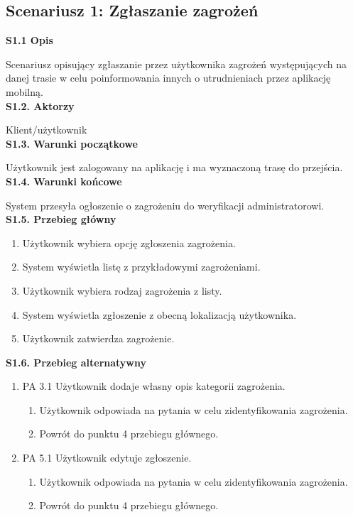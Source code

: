     \subsection*{Scenariusz 1: Zgłaszanie zagrożeń}
    \textbf{S1.1 Opis} \par
    Scenariusz opisujący zgłaszanie przez użytkownika zagrożeń występujących na danej trasie w celu poinformowania innych o utrudnieniach przez aplikację mobilną. \\
    \textbf{S1.2. Aktorzy} \par
    Klient/użytkownik \\
    \textbf{S1.3. Warunki początkowe} \par
    Użytkownik jest zalogowany na aplikację i ma wyznaczoną trasę do przejścia. \\
    \textbf{S1.4. Warunki końcowe} \par
    System przesyła ogłoszenie o zagrożeniu do weryfikacji administratorowi. \\
    \textbf{S1.5. Przebieg główny} 
    \begin{enumerate}
        \item Użytkownik wybiera opcję zgłoszenia zagrożenia.
        \item System wyświetla listę z przykładowymi zagrożeniami.
        \item Użytkownik wybiera rodzaj zagrożenia z listy.
        \item System wyświetla zgłoszenie z obecną lokalizacją użytkownika.
        \item Użytkownik zatwierdza zagrożenie.
    \end{enumerate}
    \textbf{S1.6. Przebieg alternatywny}\par 
    \begin{enumerate}
        \item []PA 3.1 Użytkownik dodaje własny opis kategorii zagrożenia.
             \begin{enumerate}
                \item Użytkownik odpowiada na pytania w celu zidentyfikowania zagrożenia.
                \item Powrót do punktu 4 przebiegu głównego.
            \end{enumerate}
        \item [] PA 5.1 Użytkownik edytuje zgłoszenie.
            \begin{enumerate}
                 \item Użytkownik odpowiada na pytania w celu zidentyfikowania zagrożenia.
                 \item Powrót do punktu 4 przebiegu głównego.
            \end{enumerate}
    \end{enumerate}
